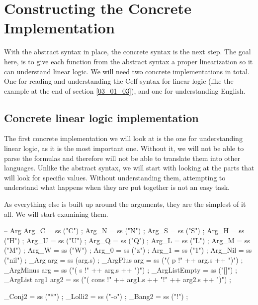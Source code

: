 \section{Constructing the Concrete Implementation}
\label{04_02}

With the abstract syntax in place, the concrete syntax is the next step. The goal here, is to give each function from the abstract syntax a proper linearization so it can understand linear logic. We will need two concrete implementations in total. One for reading and understanding the Celf syntax for linear logic (like the example at the end of section \ref{03_01_03}), and one for understanding English.

\subsection{Concrete linear logic implementation}
\label{04_02_01}

The first concrete implementation we will look at is the one for understanding linear logic, as it is the most important one. Without it, we will not be able to parse the formulas and therefore will not be able to translate them into other languages. Unlike the abstract syntax, we will start with looking at the parts that will look for specific values. Without understanding them, attempting to understand what happens when they are put together is not an easy task.

As everything else is built up around the arguments, they are the simplest of it all. We will start examining them.
\begin{lstgf}
        -- Arg
        Arg_C                           = ss ("C") ;
        Arg_N                           = ss ("N") ;
        Arg_S                           = ss ("S") ;
        Arg_H                           = ss ("H") ;
        Arg_U                           = ss ("U") ;
        Arg_Q                           = ss ("Q") ;
        Arg_L                           = ss ("L") ;
        Arg_M                           = ss ("M") ;
        Arg_W                           = ss ("W") ;
        Arg_0                           = ss ("z") ;
        Arg_1                           = ss ("1") ;
        Arg_Nil                         = ss ("nil") ;
        _Arg arg                        = ss (arg.s) ;
        _ArgPlus arg                    = ss ("( p !" ++ arg.s ++ ")") ;
        _ArgMinus arg                   = ss ("( s !" ++ arg.s ++ ")") ;
        _ArgListEmpty                   = ss ("[]") ;
        _ArgList arg1 arg2              = ss ("( cons !" ++ arg1.s ++ "!" ++ arg2.s ++ ")") ;
        
        _Conj2                          = ss ("*") ;
        _Lolli2                         = ss ("-o") ;
        _Bang2                          = ss ("!") ;
\end{lstgf}

